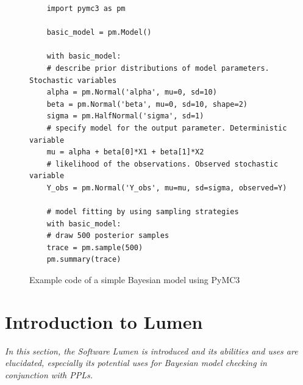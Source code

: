 \documentclass{article}
\begin{document}
\begin{figure}
	\begin{lstlisting}
	import pymc3 as pm
	
	basic_model = pm.Model()
	
	with basic_model:
	# describe prior distributions of model parameters. Stochastic variables
	alpha = pm.Normal('alpha', mu=0, sd=10)
	beta = pm.Normal('beta', mu=0, sd=10, shape=2)
	sigma = pm.HalfNormal('sigma', sd=1)
	# specify model for the output parameter. Deterministic variable
	mu = alpha + beta[0]*X1 + beta[1]*X2
	# likelihood of the observations. Observed stochastic variable
	Y_obs = pm.Normal('Y_obs', mu=mu, sd=sigma, observed=Y)
	
	# model fitting by using sampling strategies   
	with basic_model:
	# draw 500 posterior samples
	trace = pm.sample(500)
	pm.summary(trace)
	\end{lstlisting}
	\caption[Example code of a simple Bayesian model using PyMC3]{Example code of a simple Bayesian model using PyMC3}
	\label{fig:pymc3_example_code}
\end{figure}







\section{Introduction to Lumen}
\label{Lumen}
\textit{In this section, the Software Lumen is introduced and its abilities and uses are elucidated, especially its potential uses for Bayesian model checking in conjunction with PPLs.} 

\end{document}
